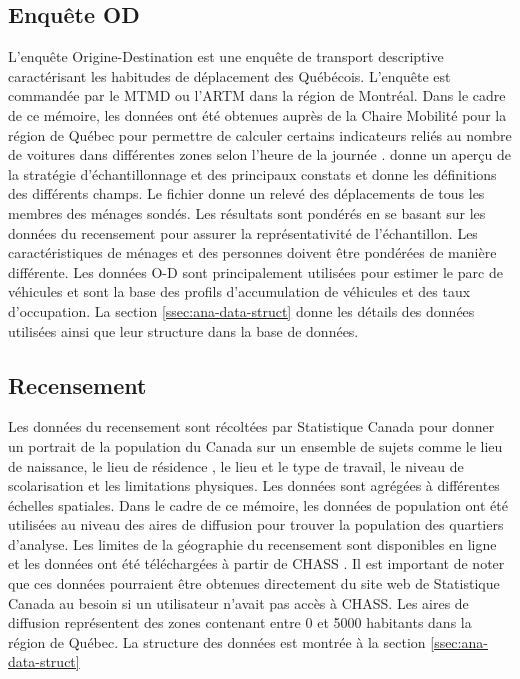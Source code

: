     \subsection{Enquête OD}
    L'enquête Origine-Destination est une enquête de transport descriptive caractérisant les habitudes de déplacement des Québécois. L'enquête est commandée par le \ac{MTMD} ou l'\ac{ARTM} dans la région de Montréal. Dans le cadre de ce mémoire, les données ont été obtenues auprès de la Chaire Mobilité pour la région de Québec pour permettre de calculer certains indicateurs reliés au nombre de voitures dans différentes zones selon l'heure de la journée \parencite{morency_characterizing_2008}. \textcite{ministere_des_transports_et_de_la_mobilite_durable_mobilite_2019} donne un aperçu de la stratégie d'échantillonnage et des principaux constats et \textcite{ministere_des_transports_et_de_la_mobilite_durable_enquete_2017} donne les définitions des différents champs. Le fichier donne un relevé des déplacements de tous les membres des ménages sondés. Les résultats sont pondérés en se basant sur les données du recensement pour assurer la représentativité de l'échantillon. Les caractéristiques de ménages et des personnes doivent être pondérées de manière différente. Les données O-D sont principalement utilisées pour estimer le parc de véhicules et sont la base des profils d'accumulation de véhicules et des taux d'occupation. La section \ref{ssec:ana-data-struct} donne les détails des données utilisées ainsi que leur structure dans la base de données. 
    \subsection{Recensement}
    Les données du recensement sont récoltées par Statistique Canada pour donner un portrait de la population du Canada  \parencite{statistique_canada_guide_2021} sur un ensemble de sujets comme le lieu de naissance, le lieu de résidence , le lieu et le type de travail, le niveau de scolarisation et les limitations physiques. Les données sont agrégées à différentes échelles spatiales. Dans le cadre de ce mémoire, les données de population ont été utilisées au niveau des aires de diffusion pour trouver la population des quartiers d'analyse. Les limites de la géographie du recensement sont disponibles en ligne \parencite{statistique_canada_fichier_2021} et les données ont été téléchargées à partir de CHASS \parencite{university_of_toronto_chass_canadian_2024}. Il est important de noter que ces données pourraient être obtenues directement du site web de Statistique Canada au besoin \parencite{statistique_canada_telechargements_2022} si un utilisateur n'avait pas accès à CHASS. Les aires de diffusion représentent des zones contenant entre 0 et 5000 habitants dans la région de Québec. La structure des données est montrée à la section \ref{ssec:ana-data-struct}
    

